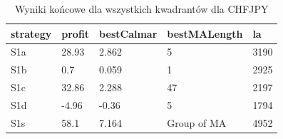 \newpage
 \begin{table}[t!]
 \caption{Wyniki końcowe dla wszystkich kwadrantów dla CHFJPY}
 \begin{center} 
 \begin{tabular}{|l|l|l|l|l|} 
 \hline \textbf{strategy} & \textbf{profit} & \textbf{bestCalmar} & \textbf{bestMALength} & \textbf{la} \\ \hline  
S1a & 28.93 & 2.862 & 5 & 3190\\ \hline 
S1b & 0.7 & 0.059 & 1 & 2925\\ \hline 
S1c & 32.86 & 2.288 & 47 & 2197\\ \hline 
S1d & -4.96 & -0.36 & 5 & 1794\\ \hline 
S1s & 58.1 & 7.164 & Group of MA & 4952\\ 
\hline \end{tabular} 
 \end{center} 
 \end{table}
\FloatBarrier
